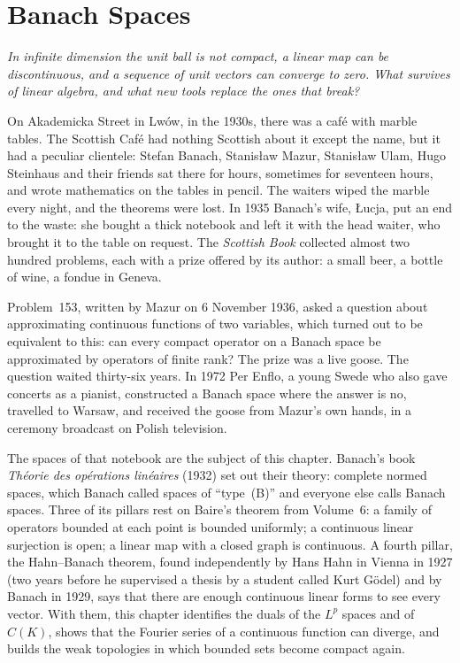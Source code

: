 \chapter{Banach Spaces}

\begin{center}\itshape
In infinite dimension the unit ball is not compact, a linear map can be discontinuous, and a sequence of unit vectors can
converge to zero. What survives of linear algebra, and what new tools replace the ones that break?
\end{center}

On Akademicka Street in Lw\'ow, in the 1930s, there was a caf\'e with marble tables. The Scottish Caf\'e had nothing Scottish
about it except the name, but it had a peculiar clientele: Stefan Banach, Stanis\l aw Mazur, Stanis\l aw Ulam, Hugo Steinhaus
and their friends sat there for hours, sometimes for seventeen hours, and wrote mathematics on the tables in pencil. The waiters
wiped the marble every night, and the theorems were lost. In 1935 Banach's wife, \L ucja, put an end to the waste: she bought a
thick notebook and left it with the head waiter, who brought it to the table on request. The \emph{Scottish Book} collected
almost two hundred problems, each with a prize offered by its author: a small beer, a bottle of wine, a fondue in Geneva.

Problem~153, written by Mazur on 6 November 1936, asked a question about approximating continuous functions of two variables,
which turned out to be equivalent to this: can every compact operator on a Banach space be approximated by operators of finite
rank? The prize was a live goose. The question waited thirty-six years. In 1972 Per Enflo, a young Swede who also gave concerts as
a pianist, constructed a Banach space where the answer is no, travelled to Warsaw, and received the goose from Mazur's own hands,
in a ceremony broadcast on Polish television.

The spaces of that notebook are the subject of this chapter. Banach's book \emph{Th\'eorie des op\'erations lin\'eaires} (1932)
set out their theory: complete normed spaces, which Banach called spaces of ``type~(B)'' and everyone else calls Banach spaces.
Three of its pillars rest on Baire's theorem from Volume~6: a family of operators bounded at each point is bounded uniformly; a
continuous linear surjection is open; a linear map with a closed graph is continuous. A fourth pillar, the Hahn--Banach theorem,
found independently by Hans Hahn in Vienna in 1927 (two years before he supervised a thesis by a student called Kurt G\"odel) and
by Banach in 1929, says that there are enough continuous linear forms to see every vector. With them, this chapter identifies
the duals of the $L^p$ spaces and of $C(K)$, shows that the Fourier series of a continuous function can diverge, and builds the
weak topologies in which bounded sets become compact again.

